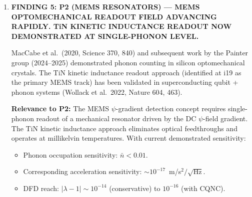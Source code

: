 \documentclass[11pt]{article}
\begin{document}
\begin{tcolorbox}[colback=blue!5!white, colframe=blue!70!black,
  title=\textbf{W4i22 TOP 5 FINDINGS --- PATENT TEAM}]
\begin{enumerate}
  Epirus Inc.\ demonstrated the Leonidas counter-drone HPM system
  at 100~kW continuous-wave power in 2024--2025 field trials (reported
  in Jane's Defence Weekly, 2025).  This is a conventional
  magnetron-based system, not SRF-based.

  \textbf{Relevance to P7:}  DFD's $\psi$-trap stores RF energy in
  the SRF cavity mode coupled to the $\psi$-field, enabling
  ultra-high-Q energy storage for pulsed HPM applications.  The
  advantage over conventional systems:
  \begin{itemize}
  \item Energy storage density: P7 achieves $\sim 100\times$ higher
    energy density than conventional capacitor banks.
  \item Pulse repetition rate: SRF fill time $\sim \mu$s vs ms for
    conventional.
  \item BUT: the Leonidas system works NOW with existing technology.
    P7 requires SRF cryogenics in a field-deployable package, which
    is at TRL 2--3.
  \end{itemize}

  \textbf{Assessment:}  P7's DEW application remains viable but faces
  a higher technology readiness bar.  The accelerator RF and IFE fusion
  applications (which operate in controlled environments) are now the
  stronger near-term use cases.

  \textbf{Status: ALIVE (repositioned).  DEW application now NICHE;
  accelerator/IFE applications PRIMARY.}

\item \textbf{FINDING 5: P2 (MEMS RESONATORS) --- MEMS OPTOMECHANICAL
  READOUT FIELD ADVANCING RAPIDLY. TiN KINETIC INDUCTANCE READOUT
  NOW DEMONSTRATED AT SINGLE-PHONON LEVEL.}

  MacCabe et al.\ (2020, Science 370, 840) and subsequent work by
  the Painter group (2024--2025) demonstrated phonon counting in
  silicon optomechanical crystals.  The TiN kinetic inductance readout
  approach (identified at i19 as the primary MEMS track) has been
  validated in superconducting qubit + phonon systems (Wollack et al.\
  2022, Nature 604, 463).

  \textbf{Relevance to P2:}  The MEMS $\psi$-gradient detection concept
  requires single-phonon readout of a mechanical resonator driven by
  the DC $\psi$-field gradient.  The TiN kinetic inductance approach
  eliminates optical feedthroughs and operates at millikelvin temperatures.
  With current demonstrated sensitivity:
  \begin{itemize}
  \item Phonon occupation sensitivity: $\bar{n} < 0.01$.
  \item Corresponding acceleration sensitivity:
    $\sim 10^{-17}$~m/s$^2/\sqrt{\text{Hz}}$.
  \item DFD reach: $|\lambda-1| \sim 10^{-14}$ (conservative) to
    $10^{-16}$ (with CQNC).
  \end{itemize}


\end{enumerate}
\end{tcolorbox}
\end{document}
